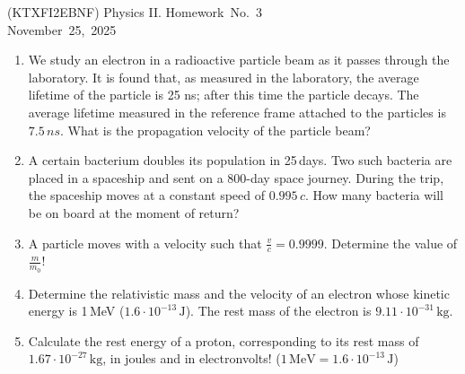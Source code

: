 \documentclass[a4paper,12pt]{letter}
\begin{document}
\begin{center}
 (KTXFI2EBNF) Physics II.  Homework~No.~3\\ \smallskip
November~25,~2025
 \end{center}

\begin{enumerate}

\item We study an electron in a radioactive particle beam as it passes through the laboratory.  It is found that, as measured in the laboratory, the average lifetime of the particle is 25 ns; after this time the particle decays.  The average lifetime measured in the reference frame attached to the particles is $7.5\,ns$.  What is the propagation velocity of the particle beam?

\item A certain bacterium doubles its population in 25\,days.  Two such bacteria are placed in a spaceship and sent on a 800-day space journey.  During the trip, the spaceship moves at a constant speed of $0.995 \, c$. How many bacteria will be on board at the moment of return?

\item A particle moves with a velocity such that $ \frac{v}{c} = 0.9999$.  Determine the value of $ \frac{m}{m_0} $!

\item Determine the relativistic mass and the velocity of an electron whose kinetic energy is 1\,MeV ($ 1.6 \cdot 10^{-13} \, \text{J} $).  The rest mass of the electron is $ 9.11 \cdot 10^{-31} \, \text{kg} $.

\item Calculate the rest energy of a proton, corresponding to its rest mass of $	1.67\cdot10^{-27}\,\text{kg} $, in joules and in electronvolts!  ($ 1 \, \text{MeV} = 1.6 \cdot 10^{-13} \, \text{J} $)
\end{enumerate}

\bigskip


\vfill
\end{document}
